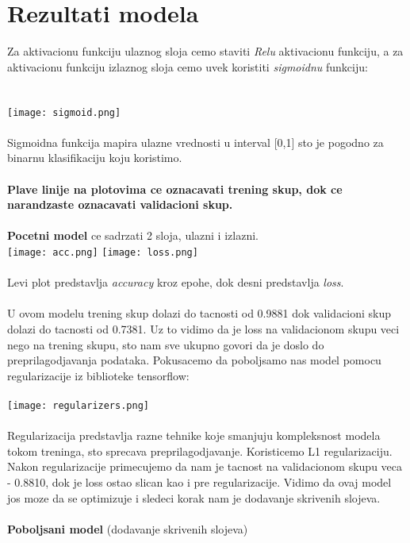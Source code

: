 \documentclass{article}
\begin{document}
 \clearpage
\section{Rezultati modela}
Za aktivacionu funkciju ulaznog sloja cemo staviti \textit{Relu} aktivacionu funkciju, a za aktivacionu funkciju izlaznog sloja cemo uvek koristiti \textit{sigmoidnu} funkciju: \\
\\
\\
 \texttt{[image: sigmoid.png]}\\
\\
Sigmoidna funkcija mapira ulazne vrednosti u interval [0,1] sto je pogodno za binarnu klasifikaciju koju koristimo.\\
\\
\textbf{Plave linije na plotovima ce oznacavati trening skup, dok ce narandzaste oznacavati validacioni skup.}\\
\\
\textbf{Pocetni model} ce sadrzati 2 sloja, ulazni i izlazni. \\
\texttt{[image: acc.png]}
\texttt{[image: loss.png]}\\
\\
Levi plot predstavlja \textit{accuracy} kroz epohe, dok desni predstavlja \textit{loss}.\\
\\
U ovom modelu trening skup dolazi do tacnosti od 0.9881 dok validacioni skup dolazi do tacnosti od 0.7381.
Uz to vidimo da je loss na validacionom skupu veci nego na trening skupu, sto nam sve ukupno govori da je doslo do preprilagodjavanja podataka. Pokusacemo da poboljsamo nas model pomocu regularizacije iz biblioteke tensorflow:\\
\\
\texttt{[image: regularizers.png]}\\
\\
Regularizacija predstavlja razne tehnike koje smanjuju kompleksnost modela tokom treninga, sto sprecava preprilagodjavanje. Koristicemo L1 regularizaciju.\\
Nakon regularizacije primecujemo da nam je tacnost na validacionom skupu veca - 0.8810, dok je loss ostao slican kao i pre regularizacije. Vidimo da ovaj model jos moze da se optimizuje i sledeci korak nam je dodavanje skrivenih slojeva.\\
\\
\textbf{Poboljsani model} (dodavanje skrivenih slojeva)\\ 
\end{document}
